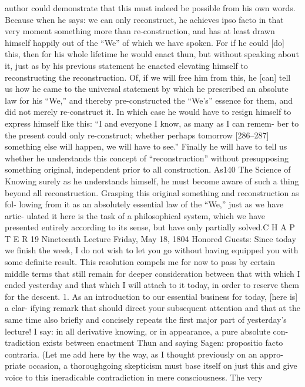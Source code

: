 author could demonstrate that this must indeed be possible from his own
words. Because when he says: we can only reconstruct, he achieves ipso facto in
that very moment something more than re-construction, and has at least drawn
himself happily out of the “We” of which we have spoken. For if he could [do]
this, then for his whole lifetime he would enact {thun}, but without speaking
about it, just as by his previous statement he enacted elevating himself to
reconstructing the reconstruction. Of, if we will free him from this, he [can] tell
us how he came to the universal statement by which he prescribed an absolute
law for his “We,” and thereby pre-constructed the “We’s” essence for them, and
did not merely re-construct it. In which case he would have to resign himself
to express himself like this: “I and everyone I know, as many as I can remem-
ber to the present could only re-construct; whether perhaps tomorrow
[286–287] something else will happen, we will have to see.” Finally he will
have to tell us whether he understands this concept of “reconstruction” without
presupposing something original, independent prior to all construction. As140
The Science of Knowing
surely as he understands himself, he must become aware of such a thing beyond
all reconstruction. Grasping this original something and reconstruction as fol-
lowing from it as an absolutely essential law of the “We,” just as we have artic-
ulated it here is the task of a philosophical system, which we have presented
entirely according to its sense, but have only partially solved.C H A P T E R
19
Nineteenth Lecture
Friday, May 18, 1804
Honored Guests:
Since today we finish the week, I do not wish to let you go without having
equipped you with some definite result. This resolution compels me for now
to pass by certain middle terms that still remain for deeper consideration
between that with which I ended yesterday and that which I will attach to it
today, in order to reserve them for the descent.
1. As an introduction to our essential business for today, [here is] a clar-
ifying remark that should direct your subsequent attention and that at the
same time also briefly and concisely repeats the first major part of yesterday’s
lecture! I say: in all derivative knowing, or in appearance, a pure absolute con-
tradiction exists between enactment {Thun} and saying {Sagen}: propositio facto
contraria. (Let me add here by the way, as I thought previously on an appro-
priate occasion, a thoroughgoing skepticism must base itself on just this and
give voice to this ineradicable contradiction in mere consciousness. The very
